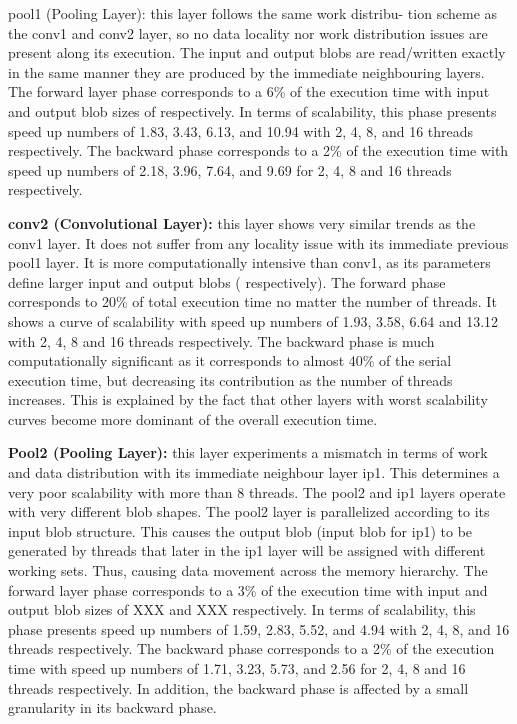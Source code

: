 pool1 (Pooling Layer): this layer follows the same work distribu-
tion scheme as the conv1 and conv2 layer, so no data locality nor
work distribution issues are present along its execution. The input
and output blobs are read/written exactly in the same manner they
are produced by the immediate neighbouring layers. The forward
layer phase corresponds to a 6\% of the execution time with input
and output blob sizes of  respectively. In terms of
scalability, this phase presents speed up numbers of 1.83, 3.43,
6.13, and 10.94 with 2, 4, 8, and 16 threads respectively. The
backward phase corresponds to a 2\% of the execution time with
speed up numbers of 2.18, 3.96, 7.64, and 9.69 for 2, 4, 8 and 16
threads respectively.

\textbf{conv2 (Convolutional Layer):} this layer shows very similar
trends as the conv1 layer. It does not suffer from any locality issue
with its immediate previous pool1 layer. It is more computationally 
intensive than conv1, as its parameters define larger input and
output blobs ( respectively). The forward phase
corresponds to 20\% of total execution time no matter the number
of threads. It shows a curve of scalability with speed up numbers
of 1.93, 3.58, 6.64 and 13.12 with 2, 4, 8 and 16 threads respectively. The backward phase is much computationally significant
as it corresponds to almost 40\% of the serial execution time, but
decreasing its contribution as the number of threads increases.
This is explained by the fact that other layers with worst scalability curves become more dominant of the overall execution time.

\textbf{Pool2 (Pooling Layer):} this layer experiments a mismatch in
terms of work and data distribution with its immediate neighbour
layer ip1. This determines a very poor scalability with more than 8
threads. The pool2 and ip1 layers operate with very different blob
shapes. The pool2 layer is parallelized according to its input blob
structure. This causes the output blob (input blob for ip1) to be
generated by threads that later in the ip1 layer will be assigned
with different working sets. Thus, causing data movement across
the memory hierarchy. The forward layer phase corresponds to a
3\% of the execution time with input and output blob sizes of XXX
and XXX respectively. In terms of scalability, this phase presents
speed up numbers of 1.59, 2.83, 5.52, and 4.94 with 2, 4, 8, and
16 threads respectively. The backward phase corresponds to a 2\%
of the execution time with speed up numbers of 1.71, 3.23, 5.73,
and 2.56 for 2, 4, 8 and 16 threads respectively. In addition, the
backward phase is affected by a small granularity in its backward
phase.

